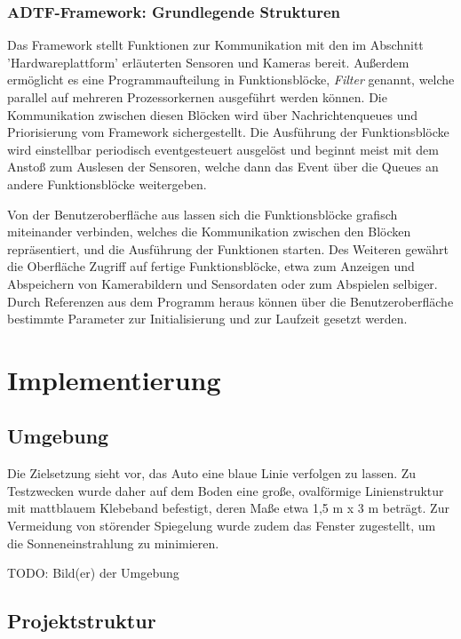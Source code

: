 \documentclass[12pt, a4paper]{scrartcl}
\begin{document}
\subsubsection{ADTF-Framework: Grundlegende Strukturen}
 Das Framework stellt Funktionen zur Kommunikation mit den im Abschnitt 'Hardwareplattform' erläuterten Sensoren und Kameras bereit. Außerdem ermöglicht es eine Programmaufteilung in Funktionsblöcke, \emph{Filter} genannt, welche parallel auf mehreren Prozessorkernen ausgeführt werden können. Die Kommunikation zwischen diesen Blöcken wird über Nachrichtenqueues und Priorisierung vom Framework sichergestellt. Die Ausführung der Funktionsblöcke wird einstellbar periodisch eventgesteuert ausgelöst und beginnt meist mit dem Anstoß zum Auslesen der Sensoren, welche dann das Event über die Queues an andere Funktionsblöcke weitergeben.

Von der Benutzeroberfläche aus lassen sich die Funktionsblöcke grafisch miteinander verbinden, welches die Kommunikation zwischen den Blöcken repräsentiert, und die Ausführung der Funktionen starten. Des Weiteren gewährt die Oberfläche Zugriff auf fertige Funktionsblöcke, etwa zum Anzeigen und Abspeichern von Kamerabildern und Sensordaten oder zum  Abspielen selbiger.
Durch Referenzen aus dem Programm heraus können über die Benutzeroberfläche bestimmte Parameter zur Initialisierung und zur Laufzeit gesetzt werden.


\newpage
\section{Implementierung}

\subsection{Umgebung}

Die Zielsetzung sieht vor, das Auto eine blaue Linie verfolgen zu lassen. Zu Testzwecken wurde daher auf dem Boden eine große, ovalförmige Linienstruktur mit mattblauem Klebeband befestigt, deren Maße etwa 1,5 m x 3 m beträgt. Zur Vermeidung von störender Spiegelung wurde zudem das Fenster zugestellt, um die Sonneneinstrahlung zu minimieren.

TODO: Bild(er) der Umgebung

\subsection{Projektstruktur}
\end{document}
